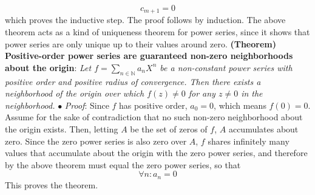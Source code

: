 \documentclass{article}
\newcommand*{\tb}{\textbf}
\newcommand*{\ti}{\textit}
\newcommand*{\n}{\newline}
\newcommand*{\nn}{\newline \newline}
\newcommand*{\Pf}{\indent \ensuremath{\bullet} \textit{Proof}: }
\newcommand*{\N}{\mathbb{N}}
\begin{document}
    $$ c_{m + 1} = 0 $$
which proves the inductive step. The proof follows by induction. \qedsymbol
\nn
The above theorem acts as a kind of uniqueness theorem for power series, since it shows that power series are only unique up to their values around zero.
\nn
\tb{(Theorem) Positive-order power series are guaranteed non-zero neighborhoods about the origin}: \ti{Let $ f = \sum_{n \in \N} a_n X^n $ be a non-constant power series with positive order and positive radius of convergence. Then there exists a neighborhood of the origin over which $ f(z) \neq 0 $ for any $ z \neq 0 $ in the neighborhood.}
\n
\Pf Since $ f $ has positive order, $ a_0 = 0 $, which means $ f(0) = 0 $. Assume for the sake of contradiction that no such non-zero neighborhood about the origin exists. Then, letting $ A $ be the set of zeros of $ f $, $ A $ accumulates about zero. Since the zero power series is also zero over $ A $, $ f $ shares infinitely many values that accumulate about the origin with the zero power series, and therefore by the above theorem must equal the zero power series, so that
    $$ \forall n: a_n = 0 $$
This proves the theorem. \qedsymbol
\end{document}
